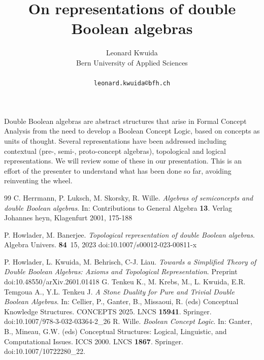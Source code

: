 \documentclass[a4paper]{article} %
\date{} %
\begin{document}
\setcounter{page}{1} %

\title{On representations of double Boolean algebras}

\author{Leonard Kwuida \\ %
       Bern University of Applied Sciences\\ \\ %
       \texttt{leonard.kwuida©bfh.ch} %
       }%

\maketitle


Double Boolean algebras are abstract structures that arise in Formal Concept Analysis from the need to develop a Boolean Concept Logic, based on concepts as units of thought. Several representations have been addressed including contextual (pre-, semi-, proto-concept algebras)\cite{HLSW00,Wi00}, topological and logical\cite{HB23,HKBL26,TKKTT2025} representations. We will review some of these in our presentation. This is an effort of the presenter to understand what has been done so far, avoiding reinventing the wheel.  

\begin{thebibliography}{99}
C. Herrmann, P. Luksch, M. Skorsky, R. Wille. \newblock \emph{Algebras of semiconcepts and double Boolean algebras}. In: Contributions to General Algebra \textbf{13}. Verlag Johannes heyn, Klagenfurt 2001, 175-188

P. Howlader, M. Banerjee. \newblock \emph{Topological representation of double Boolean algebras}. Algebra Univers. \textbf{84}~15, 2023 doi:10.1007/s00012-023-00811-x

P. Howlader, L. Kwuida, M. Behrisch, C-J. Liau. \newblock \emph{Towards a Simplified Theory of Double Boolean Algebras: Axioms and Topological Representation}. Preprint doi:10.48550/arXiv.2601.01418
G. Tenkeu K.,  M. Krebs, M., L. Kwuida, E.R. Temgoua A., Y.L. Tenkeu J. \newblock \emph{A Stone Duality for Pure and Trivial Double Boolean Algebras}. 
In: Cellier, P., Ganter, B., Missaoui, R. (eds) Conceptual Knowledge Structures. CONCEPTS 2025. LNCS \textbf{15941}. Springer. doi:10.1007/978-3-032-03364-2\_26
R. Wille. \newblock \emph{Boolean Concept Logic}. In: Ganter, B., Mineau, G.W. (eds) Conceptual Structures: Logical, Linguistic, and Computational Issues. ICCS 2000. LNCS \textbf{1867}. Springer. doi:10.1007/10722280\_22.
      



\end{thebibliography}
\end{document}
